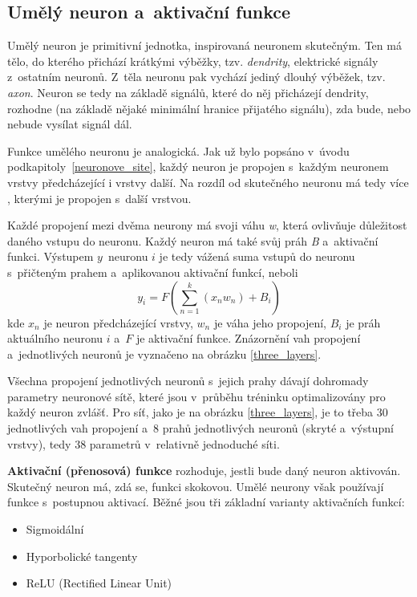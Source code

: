 \subsection{Umělý neuron a~aktivační funkce}
Umělý neuron je primitivní jednotka, inspirovaná neuronem skutečným. Ten má tělo, do kterého přichází krátkými výběžky, tzv. \emph{dendrity}, elektrické signály z~ostatním neuronů. Z~těla neuronu pak vychází jediný dlouhý výběžek, tzv. \emph{axon}. Neuron se tedy na základě signálů, které do něj přicházejí dendrity, rozhodne (na základě nějaké minimální hranice přijatého signálu), zda bude, nebo nebude vysílat signál dál.\par
Funkce umělého neuronu je analogická. Jak už bylo popsáno v~úvodu podkapitoly~\ref{neuronove_site}, každý neuron je propojen s~každým neuronem vrstvy předcházející i vrstvy další. Na rozdíl od skutečného neuronu má tedy více , kterými je propojen s~další vrstvou.\par
Každé propojení mezi dvěma neurony má svoji váhu \emph{w}, která ovlivňuje důležitost daného vstupu do neuronu. Každý neuron má také svůj práh \emph{B} a~aktivační funkci. Výstupem $y$~neuronu $i$ je tedy vážená suma vstupů do neuronu s~přičteným prahem a~aplikovanou aktivační funkcí, neboli 
\begin{equation}
y_i = F({\sum_{n=1}^k ({x_n}w_n)} + B_i)
\end{equation}
kde $x_n$ je neuron předcházející vrstvy, $w_n$ je váha jeho propojení, $B_i$ je práh aktuálního neuronu $i$ a~$F$ je aktivační funkce. Znázornění vah propojení a~jednotlivých neuronů je vyznačeno na obrázku \ref{three_layers}.\par
Všechna propojení jednotlivých neuronů s~jejich prahy dávají dohromady parametry neuronové sítě, které jsou v~průběhu tréninku optimalizovány pro každý neuron zvlášť. Pro síť, jako je na obrázku \ref{three_layers}, je to třeba 30 jednotlivých vah propojení a~8 prahů jednotlivých neuronů (skryté a~výstupní vrstvy), tedy 38 parametrů v~relativně jednoduché síti.\par
\textbf{Aktivační (přenosová) funkce} rozhoduje, jestli bude daný neuron aktivován. Skutečný neuron má, zdá se, funkci skokovou. Umělé neurony však používají funkce s~postupnou aktivací. Běžné jsou tři základní varianty aktivačních funkcí: 

\begin{itemize}
    \item Sigmoidální
    \item Hyporbolické tangenty
    \item ReLU (Rectified Linear Unit)
\end{itemize}
\pagebreak

